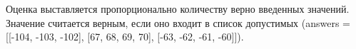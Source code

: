 \solutionSection

\markSection

Оценка выставляется пропорционально количеству верно введенных значений. Значение считается верным, если оно входит в список допустимых (answers = [[-104, -103, -102], [67, 68, 69, 70], [-63, -62, -61, -60]]). 


